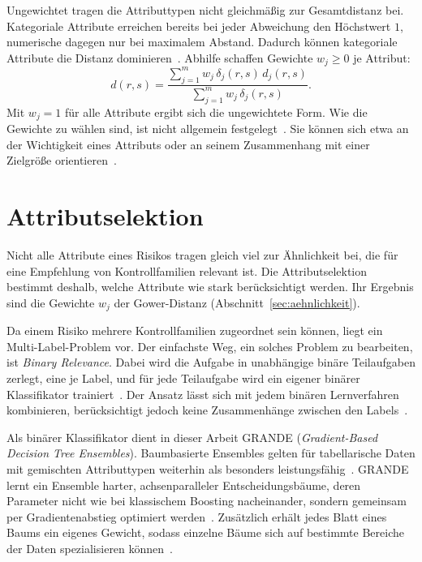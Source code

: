 Ungewichtet tragen die Attributtypen nicht gleichmäßig zur Gesamtdistanz bei.
Kategoriale Attribute erreichen bereits bei jeder Abweichung den Höchstwert $1$, numerische dagegen nur bei maximalem Abstand.
Dadurch können kategoriale Attribute die Distanz dominieren~\cites[S.~7--8]{DOrazio2021}[S.~3]{Liu2024}[S.~90]{Foss2019}.
Abhilfe schaffen Gewichte $w_j \geq 0$ je Attribut:
\[
  d(r,s) = \frac{\sum_{j=1}^{m} w_j\, \delta_j(r,s)\, d_j(r,s)}{\sum_{j=1}^{m} w_j\, \delta_j(r,s)}.
\]
Mit $w_j = 1$ für alle Attribute ergibt sich die ungewichtete Form.
Wie die Gewichte zu wählen sind, ist nicht allgemein festgelegt~\cites[S.~89]{Foss2019}[S.~3]{Velden2019}.
Sie können sich etwa an der Wichtigkeit eines Attributs oder an seinem Zusammenhang mit einer Zielgröße orientieren~\cites[S.~3--5]{Liu2024}[S.~10]{Tarsitano2011}.

\section{Attributselektion}\label{sec:selektion-grundlagen}
Nicht alle Attribute eines Risikos tragen gleich viel zur Ähnlichkeit bei, die für eine Empfehlung von Kontrollfamilien relevant ist.
Die Attributselektion bestimmt deshalb, welche Attribute wie stark berücksichtigt werden.
Ihr Ergebnis sind die Gewichte $w_j$ der Gower-Distanz (Abschnitt~\ref{sec:aehnlichkeit}).

Da einem Risiko mehrere Kontrollfamilien zugeordnet sein können, liegt ein Multi-Label-Problem vor.
Der einfachste Weg, ein solches Problem zu bearbeiten, ist \emph{Binary Relevance}.
Dabei wird die Aufgabe in unabhängige binäre Teilaufgaben zerlegt, eine je Label, und für jede Teilaufgabe wird ein eigener binärer Klassifikator trainiert~\cite[S.~191--192]{Zhang2018}.
Der Ansatz lässt sich mit jedem binären Lernverfahren kombinieren, berücksichtigt jedoch keine Zusammenhänge zwischen den Labels~\cite[S.~191--193]{Zhang2018}.

Als binärer Klassifikator dient in dieser Arbeit GRANDE (\emph{Gradient-Based Decision Tree Ensembles}).
Baumbasierte Ensembles gelten für tabellarische Daten mit gemischten Attributtypen weiterhin als besonders leistungsfähig~\cite[S.~1]{marton2024grande}.
GRANDE lernt ein Ensemble harter, achsenparalleler Entscheidungsbäume, deren Parameter nicht wie bei klassischem Boosting nacheinander, sondern gemeinsam per Gradientenabstieg optimiert werden~\cite[S.~1--3]{marton2024grande}.
Zusätzlich erhält jedes Blatt eines Baums ein eigenes Gewicht, sodass einzelne Bäume sich auf bestimmte Bereiche der Daten spezialisieren können~\cite[S.~4--5]{marton2024grande}.


